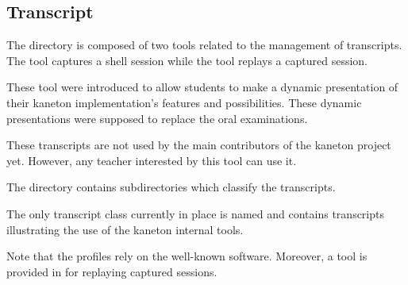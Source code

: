 %
%
%
%
%
%

%
%

\subsection{Transcript}
\label{section:transcript}

The  directory is composed of two tools related to
the management of transcripts. The  tool captures a
shell session while the  tool replays a captured session.

These tool were introduced to allow students to make a dynamic presentation
of their kaneton implementation's features and possibilities. These dynamic
presentations were supposed to replace the oral examinations.

These transcripts are not used by the main contributors of the kaneton
project yet. However, any teacher interested by this tool can use it.

The  directory contains subdirectories which classify
the transcripts.

The only transcript class currently in place is named  and
contains transcripts illustrating the use of the kaneton internal tools.

Note that the   profiles rely on the well-known
  software. Moreover, a tool is provided in
 for replaying  captured sessions.
